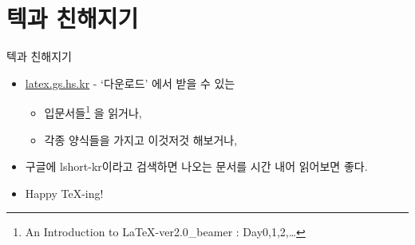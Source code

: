 \documentclass[12pt]{beamer}
\begin{document}
\section{텍과 친해지기}
\begin{frame}{텍과 친해지기}
	\begin{itemize}
		\item \url{latex.gs.hs.kr} - `다운로드' 에서 받을 수 있는
		\begin{itemize}
			\item 입문서들\footnote{An Introduction to LaTeX-ver2.0\_beamer : Day0,1,2,\ldots} 을 읽거나,
			\item 각종 양식들을 가지고 이것저것 해보거나,
		\end{itemize}
		\item 구글에 lshort-kr이라고 검색하면 나오는 문서를 시간 내어 읽어보면 좋다.
		\item Happy \TeX-ing!
	\end{itemize}
\end{frame}
\end{document}
